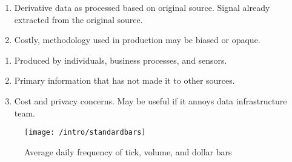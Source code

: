 \begin{remark} 
\begin{enumerate}[label=\roman*.]
\setlength{\itemsep}{0pt}
\item Derivative data as processed based on original source. Signal already extracted from the original source.
\item Costly, methodology used in production may be biased or opaque.
\end{enumerate}
\end{remark}

\begin{remark} 
\begin{enumerate}[label=\roman*.]
\setlength{\itemsep}{0pt}
\item Produced by individuals, business processes, and sensors.
\item Primary information that has not made it to other sources.
\item Cost and privacy concerns. May be useful if it annoys data infrastructure team.
\end{enumerate}
\end{remark}

\begin{figure}[H]
\centering
\texttt{[image: /intro/standardbars]}
\caption{Average daily frequency of tick, volume, and dollar bars}
\end{figure}

